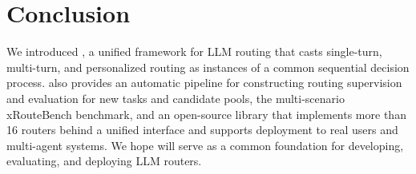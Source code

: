 \section{Conclusion}
\label{sec:conclusion}

We introduced \method, a unified framework for LLM routing that casts single-turn, multi-turn, and personalized routing as instances of a common sequential decision process. \method also provides an automatic pipeline for constructing routing supervision and evaluation for new tasks and candidate pools, the multi-scenario xRouteBench benchmark, and an open-source library that implements more than 16 routers behind a unified interface and supports deployment to real users and multi-agent systems. We hope \method will serve as a common foundation for developing, evaluating, and deploying LLM routers.